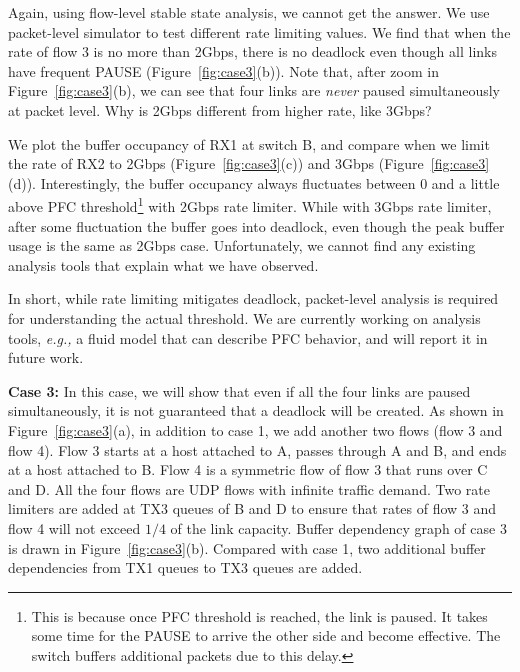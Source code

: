 Again, using flow-level stable state analysis, we cannot get the answer. We use packet-level simulator
to test different rate limiting values. We find that when the rate of flow 3 is no more than 2Gbps,
there is no deadlock even though all links have frequent PAUSE (Figure~\ref{fig:case3}(b)).
Note that, after zoom in Figure~\ref{fig:case3}(b), we can see that four links are {\em never} paused
simultaneously at packet level. Why is 2Gbps different from higher rate, like 3Gbps?

We plot the buffer occupancy of RX1 at switch B, and compare when we limit the rate of RX2 to 2Gbps
(Figure~\ref{fig:case3}(c)) and 3Gbps (Figure~\ref{fig:case3}(d)). Interestingly, the buffer occupancy
always fluctuates between 0 and a little above PFC threshold\footnote{This is because once PFC threshold is
reached, the link is paused. It takes some time for the PAUSE to arrive the other side and become effective.
The switch buffers additional packets due to this delay.} with 2Gbps rate limiter. While with 3Gbps rate
limiter, after some fluctuation the buffer goes into deadlock, even though the peak buffer usage is the same 
as 2Gbps case. Unfortunately, we cannot find any existing analysis tools that explain 
what we have observed. 

In short, while rate limiting mitigates deadlock, packet-level analysis is required for understanding
the actual threshold. We are currently working on analysis tools, {\em e.g.,} a fluid model that 
can describe PFC behavior, and will report it in future work.







\textbf{Case 3:} In this case, we will show that even if all the four links are paused simultaneously, 
it is not guaranteed that a deadlock will be created. As shown in Figure~\ref{fig:case3}(a), in addition 
to case 1, we add another two flows (flow 3 and flow 4). Flow 3 starts at a host attached to A, passes 
through A and B, and ends at a host attached to B. Flow 4 is a symmetric flow of flow 3 that runs over 
C and D. All the four flows are UDP flows with infinite traffic demand. Two rate limiters are added at 
TX3 queues of B and D to ensure that rates of flow 3 and flow 4 will not exceed $1/4$ of the link 
capacity. Buffer dependency graph of case 3 is drawn in Figure~\ref{fig:case3}(b). Compared with case 1, 
two additional buffer dependencies from TX1 queues to TX3 queues are added.


